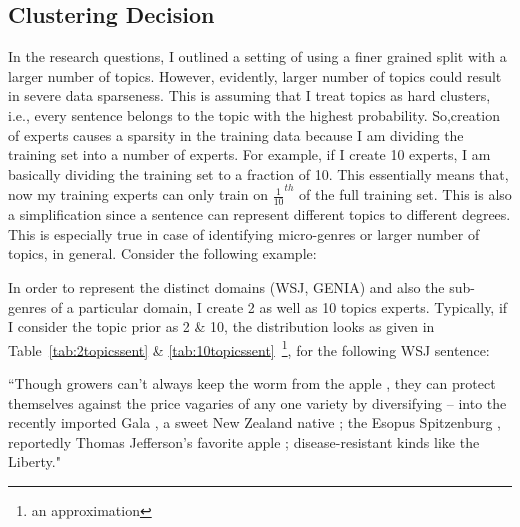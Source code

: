 \subsection{Clustering Decision}

In the research questions, I outlined a setting of using a finer grained split with a larger number of topics. However, evidently, 
larger number of topics could result in severe data sparseness. This is assuming that I treat topics as hard clusters, i.e., every sentence belongs to the topic with the highest probability. So,creation of experts causes a sparsity in the training data because I am dividing the training set into a number of experts. For example, if I create 10 experts, I am basically dividing the training set to a fraction of 10. This essentially means that, now my training experts can only train on $\frac{1}{10}^{th}$ of the full training set. 
This is also a simplification since a sentence can represent different topics to different degrees. This is especially true in case of identifying micro-genres or larger number of topics, in general.
Consider the following example:

In order to represent the distinct domains (WSJ, GENIA) and also the sub-genres of a particular domain, I create 2 as well as 10 topics experts. Typically, if I consider the topic prior as 2 \& 10, the distribution looks as given in Table~\ref{tab:2topicssent} \& \ref{tab:10topicssent}~\footnote{an approximation}, for the following WSJ sentence:

``Though growers can't always keep the worm from the apple , they can protect themselves against the price vagaries of any one variety by diversifying -- into the recently imported Gala , a sweet New Zealand native ; the Esopus Spitzenburg , reportedly Thomas Jefferson's favorite apple ; disease-resistant kinds like the Liberty."
 
